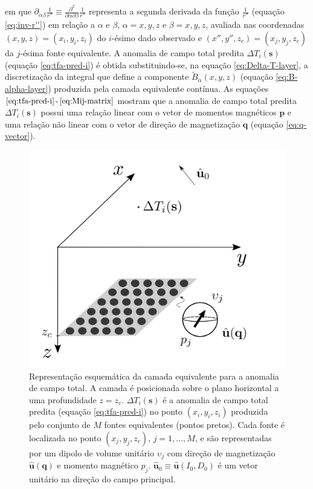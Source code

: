 em que $\partial_{\alpha\beta} \frac{1}{r''} \equiv \frac{\partial^{2}}{\partial \alpha \partial \beta} \frac{1}{r''}$ 
representa a segunda derivada da função $\frac{1}{r''}$ (equação \ref{eq:inv-r''}) em relação a $\alpha$ e $\beta$, 
$\alpha = x, y, z$ e $\beta = x, y, z$, avaliada nas coordenadas $(x, y, z) = (x_{i}, y_{i}, z_{i})$ do $i$-ésimo dado  
observado e $(x'', y'', z_{c}) = (x_{j}, y_{j}, z_{c})$ da $j$-ésima fonte equivalente.
A anomalia de campo total predita $\Delta T_{i}(\mathbf{s})$ (equação \ref{eq:tfa-pred-i}) é 
obtida substituindo-se, na equação \ref{eq:Delta-T-layer}, a 
discretização da integral que define a componente $\tilde{B}_{\alpha}(x, y, z)$
(equação \ref{eq:B-alpha-layer}) produzida pela camada equivalente contínua.
As equações $\ref{eq:tfa-pred-i}$-$\ref{eq:Mij-matrix}$ mostram que a anomalia de campo total predita 
$\Delta T_{i}(\mathbf{s})$ possui uma relação linear com o vetor de momentos magnéticos $\mathbf{p}$ e uma 
relação não linear com o vetor de direção de magnetização $\mathbf{q}$ (equação \ref{eq:q-vector}).


\begin{figure}[H]
	\centering
	\includegraphics[width=.7\textwidth]{Fig/eqlayer/eqlayer_figure_tfa.png}
	\caption{Representação esquemática da camada equivalente para a anomalia de campo total. A camada é posicionada 
	sobre o plano horizontal a uma profundidade $z=z_{c}$. $\Delta T_{i}(\mathbf{s})$ é a anomalia de campo total predita 
	(equação \ref{eq:tfa-pred-i}) no ponto 
	$(x_{i},y_{i},z_{i})$ produzida pelo conjunto de $M$ fontes equivalentes (pontos pretos). Cada fonte é localizada 
	no ponto  $(x_{j},y_{j},z_{c})$, $j = 1, \dots, M$, e são representadas por um dipolo de volume unitário 
	$\upsilon_{j}$ com direção de magnetização $\hat{\mathbf{u}}(\mathbf{q})$ e momento magnético $p_{j}$. 
	$\hat{\mathbf{u}}_{0} \equiv \hat{\mathbf{u}}(I_{0}, D_{0})$ é um vetor unitário na direção do campo 
	principal.}
	\label{fig:eqlayer_tfa_sketch}
\end{figure}



